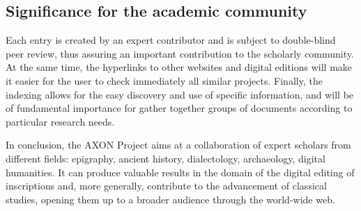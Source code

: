 \documentclass[amsthm,ebook]{saparticle}
\begin{document}
\subsection{Significance for the academic community}





\noindent Each entry is created by an expert contributor and is subject to double-blind peer review, thus assuring an important
contribution to the scholarly community. At the same time, the hyperlinks to other websites and digital editions will
make it easier for the user to check immediately all similar projects. Finally, the indexing allows for the easy
discovery and use of specific information, and will be of fundamental importance for gather together groups of
documents according to particular research needs.

In conclusion, the AXON Project aims at a collaboration of expert scholars from different fields: epigraphy, ancient
history, dialectology, archaeology, digital humanities. It can produce valuable results in the domain of the digital
editing of inscriptions and, more generally, contribute to the advancement of classical studies, opening them up to a
broader audience through the world-wide web.




\end{document}
